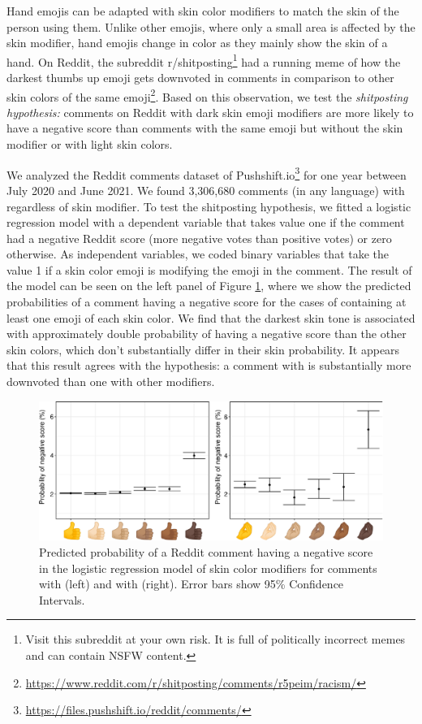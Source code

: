 \documentclass{article}
\begin{document}
Hand emojis can be adapted with skin color modifiers to match the skin of the person using them. Unlike other emojis, where only a small area is affected by the skin modifier, hand emojis change in color as they mainly show the skin of a hand. On Reddit, the subreddit r/shitposting\footnote{Visit this subreddit at your own risk. It is full of politically incorrect memes and can contain NSFW content.} had a running meme of how the darkest thumbs up emoji gets downvoted in comments in comparison to other skin colors of the same emoji\footnote{\url{https://www.reddit.com/r/shitposting/comments/r5peim/racism/}}. Based on this observation, we test the \emph{shitposting hypothesis:} comments on Reddit with dark skin emoji modifiers are more likely to have a negative score than comments with the same emoji but without the skin modifier or with light skin colors.

We analyzed the Reddit comments dataset of Pushshift.io\footnote{\url{https://files.pushshift.io/reddit/comments/}} \cite{Pushshift} for one year between July 2020 and June 2021. We found 3,306,680 comments (in any language) with  regardless of skin modifier. To test the shitposting hypothesis, we fitted a logistic regression model with a dependent variable that takes value one if the comment had a negative Reddit score (more negative votes than positive votes) or zero otherwise. As independent variables, we coded binary variables that take the value 1 if a skin color emoji is modifying the  emoji in the comment. The result of the model can be seen on the left panel of Figure \ref{fig:Skin1}, where we show the predicted probabilities of a comment having a negative score for the cases of containing at least one emoji of each skin color. We find that the darkest skin tone is associated with approximately double probability of having a negative score than the other skin colors, which don't substantially differ in their skin probability. It appears that this result agrees with the hypothesis: a comment with  is substantially more downvoted than one with other modifiers. 

\begin{figure}[h!]
    \centering
    \includegraphics[width=0.9\linewidth]{Plots/Shitposting.pdf}
    \caption{Predicted probability of a Reddit comment having a negative score in the logistic regression model of skin color modifiers for comments with  (left) and with  (right). Error bars show 95\% Confidence Intervals.}
    \label{fig:Skin1}
\end{figure}
\end{document}
